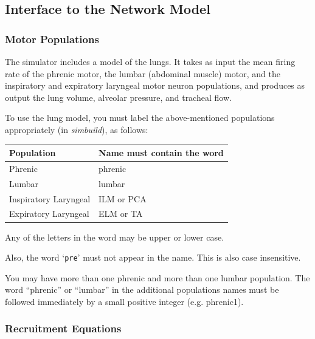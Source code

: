 \documentclass[12pt,openany,oneside]{book}
\newcommand{\tisamp}[1]{`\texttt{#1}'}
\newcommand{\prog}[1]{\textit{{#1}}}
\newcommand{\inquotes}[1]{{{``#1''}}}
\begin{document}
\subsection{Interface to the Network Model}

\subsubsection{Motor Populations}

The simulator includes a model of the lungs. It takes as input the mean
firing rate of the phrenic motor, the lumbar (abdominal muscle)
motor, and the inspiratory and expiratory laryngeal motor neuron
populations, and produces as output the lung volume, alveolar pressure,
and tracheal flow.

To use the lung model, you must label the above-mentioned populations
appropriately (in \prog{simbuild}), as follows:

\label{Motor Populations}
\begin{flushleft}
\begin{tabular}{@{}ll@{}}
Population & Name must contain the word\\
\hline\noalign{\smallskip}
Phrenic & phrenic\\
Lumbar  & lumbar\\
Inspiratory Laryngeal & ILM or PCA\\
Expiratory Laryngeal & ELM or TA\\
\end{tabular}
\end{flushleft}

\noindent
Any of the letters in the word may be upper or lower case.

\noindent
Also, the word \tisamp{pre} must not appear in the name. This is also
case insensitive.

You may have more than one phrenic and more than one lumbar population.
The word \inquotes{phrenic} or \inquotes{lumbar} in the additional
populations names must be followed immediately by a small positive integer
(e.g. phrenic1).

\subsubsection{Recruitment Equations}
\label{Recruitment Equations}
\end{document}
